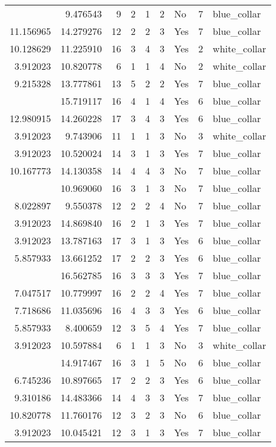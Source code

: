 \documentclass[
]{article}
\begin{document}
\begin{longtable}[t]{rrrrrllrl}
\addlinespace
3.912023 & 9.476543 & 9 & 2 & 1 & 2 & No & 7 & blue\_collar\\
11.156965 & 14.279276 & 12 & 2 & 2 & 3 & Yes & 7 & blue\_collar\\
10.128629 & 11.225910 & 16 & 3 & 4 & 3 & Yes & 2 & white\_collar\\
3.912023 & 10.820778 & 6 & 1 & 1 & 4 & No & 2 & white\_collar\\
9.215328 & 13.777861 & 13 & 5 & 2 & 2 & Yes & 7 & blue\_collar\\
\addlinespace
3.912023 & 15.719117 & 16 & 4 & 1 & 4 & Yes & 6 & blue\_collar\\
12.980915 & 14.260228 & 17 & 3 & 4 & 3 & Yes & 6 & blue\_collar\\
3.912023 & 9.743906 & 11 & 1 & 1 & 3 & No & 3 & white\_collar\\
3.912023 & 10.520024 & 14 & 3 & 1 & 3 & Yes & 7 & blue\_collar\\
10.167773 & 14.130358 & 14 & 4 & 4 & 3 & No & 7 & blue\_collar\\
\addlinespace
3.912023 & 10.969060 & 16 & 3 & 1 & 3 & No & 7 & blue\_collar\\
8.022897 & 9.550378 & 12 & 2 & 2 & 4 & No & 7 & blue\_collar\\
3.912023 & 14.869840 & 16 & 2 & 1 & 3 & Yes & 7 & blue\_collar\\
3.912023 & 13.787163 & 17 & 3 & 1 & 3 & Yes & 6 & blue\_collar\\
5.857933 & 13.661252 & 17 & 2 & 2 & 3 & Yes & 6 & blue\_collar\\
\addlinespace
12.570889 & 16.562785 & 16 & 3 & 3 & 3 & Yes & 7 & blue\_collar\\
7.047517 & 10.779997 & 16 & 2 & 2 & 4 & Yes & 7 & blue\_collar\\
7.718686 & 11.035696 & 16 & 4 & 3 & 3 & Yes & 6 & blue\_collar\\
5.857933 & 8.400659 & 12 & 3 & 5 & 4 & Yes & 7 & blue\_collar\\
3.912023 & 10.597884 & 6 & 1 & 1 & 3 & No & 3 & white\_collar\\
\addlinespace
3.912023 & 14.917467 & 16 & 3 & 1 & 5 & No & 6 & blue\_collar\\
6.745236 & 10.897665 & 17 & 2 & 2 & 3 & Yes & 6 & blue\_collar\\
9.310186 & 14.483366 & 14 & 4 & 3 & 3 & Yes & 7 & blue\_collar\\
10.820778 & 11.760176 & 12 & 3 & 2 & 3 & No & 6 & blue\_collar\\
3.912023 & 10.045421 & 12 & 3 & 1 & 3 & Yes & 7 & blue\_collar\\

\end{longtable}
\end{document}
